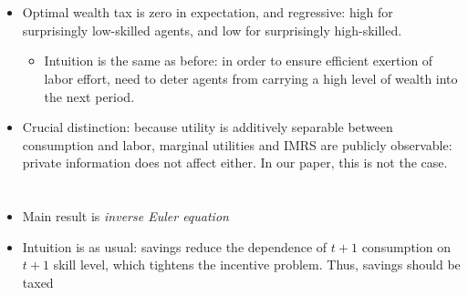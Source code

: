 \documentclass[11pt]{article}
\begin{document}
\section{\cite{kocherlakota2005zero}}
\begin{itemize}
    \item Optimal wealth tax is zero in expectation, and regressive: high for surprisingly low-skilled agents, and low for surprisingly high-skilled. 
    \begin{itemize}
        \item Intuition is the same as before: in order to ensure efficient exertion of labor effort, need to deter agents from carrying a high level of wealth into the next period. 
    \end{itemize}
    \item Crucial distinction: because utility is additively separable between consumption and labor, marginal utilities and IMRS are publicly observable: private information does not affect either. In our paper, this is not the case. 
\end{itemize}

\section{\cite{golosov2003optimal}} \label{sec:golosov03}
\begin{itemize}
    \item Main result is \textit{inverse Euler equation}
    \item Intuition is as usual: savings reduce the dependence of \( t+1 \) consumption on \( t+1 \) skill level, which tightens the incentive problem. Thus, savings should be taxed
\end{itemize}
\end{document}
